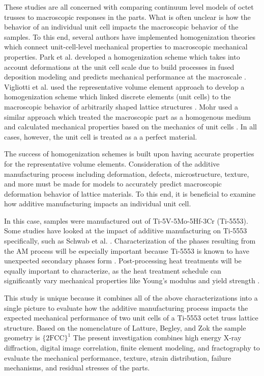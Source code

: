 These studies are all concerned with comparing continuum level models of octet trusses to macroscopic responses in the parts. What is often unclear is how the behavior of an individual unit cell impacts the macroscopic behavior of the samples. To this end, several authors have implemented homogenization theories which connect unit-cell-level mechanical properties to macroscopic mechanical properties. Park et al. developed a homogenization scheme which takes into account deformations at the unit cell scale due to build processes in fused deposition modeling and predicts mechanical performance at the macroscale \cite{Park2014}. Vigliotti et al. used the representative volume element approach to develop a homogenization scheme which linked discrete elements (unit cells) to the macroscopic behavior of arbitrarily shaped lattice structures \cite{Vigliotti2014}. Mohr used a similar approach which treated the macroscopic part as a homogenous medium and calculated mechanical properties based on the mechanics of unit cells \cite{Mohr2005}. In all cases, however, the unit cell is treated as a  a perfect material.

The success of homogenization schemes is built upon having accurate properties for the representative volume elements. Consideration of the additive manufacturing process including deformation, defects, microstructure, texture, and more must be made for models to accurately predict macroscopic deformation behavior of lattice materials. To this end, it is beneficial to examine how additive manufacturing impacts an individual unit cell.

In this case, samples were manufactured out of Ti-5V-5Mo-5Hf-3Cr (Ti-5553). Some studies have looked at the impact of additive manufacturing on Ti-5553 specifically, such as Schwab et al. \cite{Schwab2016}. Characterization of the phases resulting from the AM process will be especially important because Ti-5553 is known to have unexpected secondary phases form \cite{Dehghan-Manshadi2011, Zheng2016}. Post-processing heat treatments will be equally important to characterize, as the heat treatment schedule can significantly vary mechanical properties like Young's modulus and yield strength \cite{Kar2014}.

This study is unique because it combines all of the above characterizations into a single picture to evaluate how the additive manufacturing process impacts the expected mechanical performance of two unit cells of a Ti-5553 octet truss lattice structure. Based on the nomenclature of Latture, Begley, and Zok \cite{Latture2019} the sample geometry is $\{2\text{FCC}\}^1$ The present investigation combines high energy X-ray diffraction, digital image correlation, finite element modeling, and fractography to evaluate the mechanical performance, texture, strain distribution, failure mechanisms, and residual stresses of the parts. 

